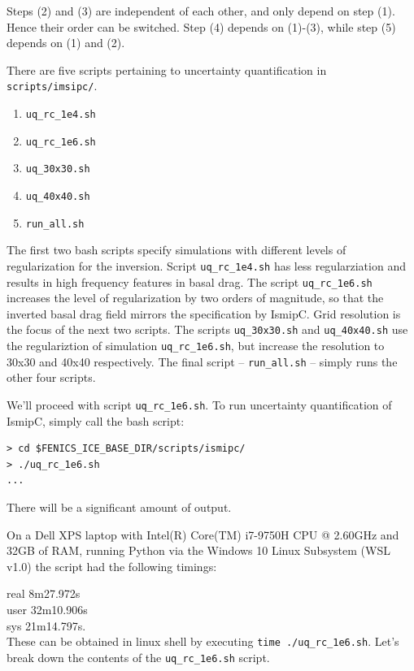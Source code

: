 \documentclass[11pt, reqno, nocenter]{article}
\begin{document}
Steps (2) and (3) are independent of each other, and only depend on step (1). Hence their order can be switched. Step (4) depends on (1)-(3), while step (5) depends on (1) and (2).

There are five scripts pertaining to uncertainty quantification in {\tt scripts/imsipc/}.
\begin{enumerate}
	\item {\tt uq\_rc\_1e4.sh  }
	\item {\tt uq\_rc\_1e6.sh}
	\item {\tt uq\_30x30.sh  }
	\item {\tt uq\_40x40.sh  }
	\item {\tt run\_all.sh}  
\end{enumerate}

The first two bash scripts specify simulations with different levels of regularization for the inversion. Script {\tt uq\_rc\_1e4.sh} has less regularziation and results in high frequency features in basal drag. The script {\tt uq\_rc\_1e6.sh} increases the level of regularization by two orders of magnitude, so that the inverted basal drag field mirrors the specification by IsmipC. Grid resolution is the focus of the next two scripts. The scripts {\tt uq\_30x30.sh} and {\tt uq\_40x40.sh} use the regulariztion of simulation {\tt uq\_rc\_1e6.sh}, but increase the resolution to 30x30 and 40x40 respectively. The final script -- {\tt run\_all.sh}  -- simply runs the other four scripts.

We'll proceed with script {\tt uq\_rc\_1e6.sh}. To run uncertainty quantification of IsmipC, simply call the bash script:
\begin{verbatim}
> cd $FENICS_ICE_BASE_DIR/scripts/ismipc/
> ./uq_rc_1e6.sh
...
\end{verbatim}

There will be a significant amount of output. 

On a Dell XPS laptop with Intel(R) Core(TM) i7-9750H CPU @ 2.60GHz and 32GB of RAM, running Python via the Windows 10 Linux Subsystem (WSL v1.0) the script had the following timings:   

real	\hspace{10mm} 8m27.972s \\
user  \hspace{9mm}  32m10.906s \\
sys    \hspace{11mm} 21m14.797s. \\

These can be obtained in linux shell by executing {\tt time ./uq\_rc\_1e6.sh}. Let's break down the contents of the {\tt uq\_rc\_1e6.sh} script.
\end{document}
